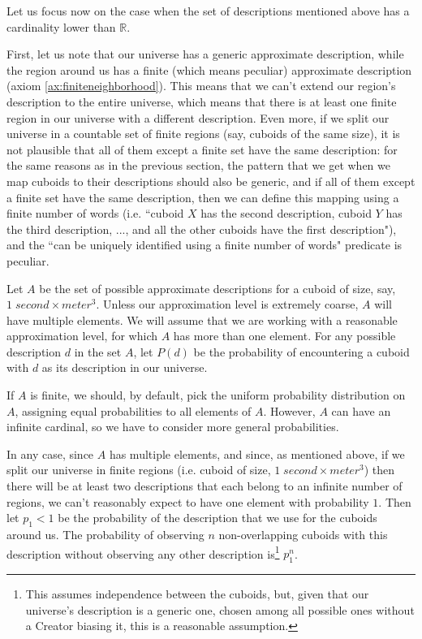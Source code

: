 \documentclass[a4paper
]{article}
\def\reale{\mathbb{R}}
\newcommand{\ghilimele}[1]{``#1"}
\begin{document}
Let us focus now on the case when the set of descriptions mentioned above
has a cardinality lower than $\reale$.

First, let us note that our universe has a generic approximate description,
while the region around us has a finite (which means peculiar) approximate
description (axiom \ref{ax:finiteneighborhood}).
This means that we can't
extend our region's description to the entire universe, which means that
there is at least one finite region in our universe with a different
description.
Even more, if we split our universe in a countable set of finite regions
(say, cuboids of the same size),
it is not plausible that all of them except a finite set have the same
description: for the same reasons as in the previous section,
the pattern that we get when we map cuboids to their descriptions should also
be generic, and if all of them except a finite set have the same description,
then we can define this mapping using a finite number of words
(i.e. \ghilimele{cuboid $X$ has the second description,
cuboid $Y$ has the third description, ..., and all the other cuboids have the
first description}), and the \ghilimele{can be uniquely identified using a
finite number of words} predicate is peculiar.

Let $A$ be the set of possible approximate descriptions for
a cuboid of size, say, $1\;second \times meter^3$.
Unless our approximation level is extremely coarse,
$A$ will have multiple elements.
We will assume that we are working with a reasonable approximation level,
for which $A$ has more than one element.
For any possible description $d$ in the set $A$,
let $P(d)$ be the probability of encountering
a cuboid with $d$ as its description in our universe.

If $A$ is finite, we should, by default, pick the uniform probability
distribution on $A$, assigning equal probabilities to all elements of $A$.
However, $A$ can have an infinite cardinal,
so we have to consider more general probabilities.

In any case, since $A$ has multiple elements, and since, as mentioned above,
if we split our universe in finite regions
(i.e. cuboid of size, $1\;second \times meter^3$) then there will be
at least two descriptions that each belong to an infinite number of regions,
we can't reasonably expect to have one element with probability $1$.
Then let $p_1<1$ be the probability of the description that we use for the
cuboids around us.
The probability of observing $n$
non-overlapping cuboids
with this description without observing any other description is\footnote{
  This assumes independence between the cuboids, but, given that our
  universe's description is a generic one, chosen among all possible
  ones without a Creator biasing it, this is a reasonable assumption.
}
$p_1^n$.
\end{document}
